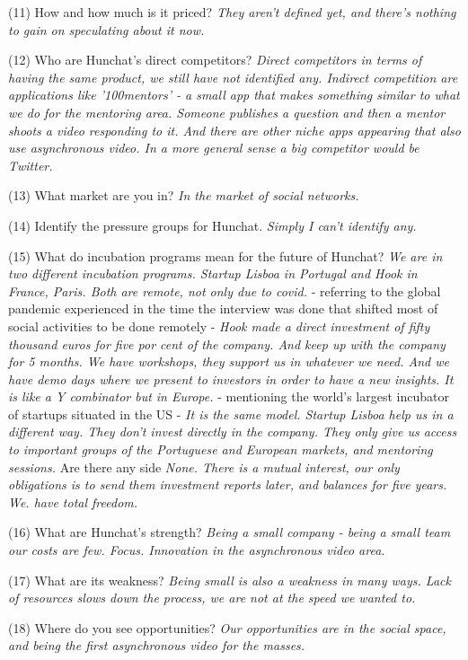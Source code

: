 \documentclass[12pt]{article}
\begin{document}
(11) How and how much is it priced? \textit{They aren't defined yet, and there's nothing to gain on speculating about it now.}

(12) Who are Hunchat’s direct competitors? \textit{Direct competitors in terms of having the same product, we still have not identified any. Indirect competition are applications like '100mentors' - a small app that makes something similar to what we do for the mentoring area. Someone publishes a question and then a mentor shoots a video responding to it. And there are other niche apps appearing that also use asynchronous video. In a more general sense a big competitor would be Twitter. }

(13) What market are you in? \textit{In the market of social networks.}

(14) Identify the pressure groups for Hunchat. \textit{Simply I can't identify any.} 

(15) What do incubation programs mean for the future of Hunchat? \textit{We are in two different incubation programs. Startup Lisboa in Portugal and Hook in France, Paris. Both are remote, not only due to covid.} - referring to the global pandemic experienced in the time the interview was done that shifted most of social activities to be done remotely - \textit{Hook made a direct investment of fifty thousand euros for five por cent of the company. And keep up with the company for 5 months. We have workshops, they support us in whatever we need. And we have demo days where we present to investors in order to have a new insights. It is like a Y combinator but in Europe.} - mentioning the world's largest incubator of startups situated in the US -\textit{ It is the same model. Startup Lisboa help us in a different way. They don't invest directly in the company. They only give us access to important groups of the Portuguese and European markets, and mentoring sessions.} Are there any side \textit{None. There is a mutual interest, our only obligations is to send them investment reports later, and balances for five years. We. have total freedom.}

(16) What are Hunchat’s strength? \textit{Being a small company - being a small team our costs are few. Focus. Innovation in the asynchronous video area.}

(17) What are its weakness? \textit{Being small is also a weakness in many ways. Lack of resources slows down the process, we are not at the speed we wanted to.}

(18) Where do you see opportunities? \textit{Our opportunities are in the social space, and being the first asynchronous video for the masses.}
\end{document}
